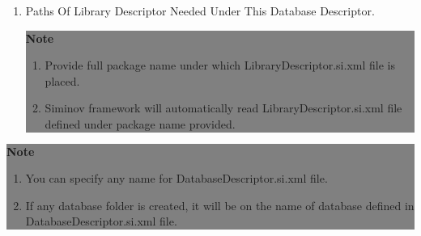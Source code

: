 \begin{enumerate}
\begin{center}
			\end{center}

	\item \small Paths Of Library Descriptor Needed Under This Database Descriptor.

			\begin{center}
				\colorbox{grey}{
					\parbox[t]{.8\linewidth}{
						\fontsize{11pt}{11pt}\selectfont %
						\vspace*{0.1cm} %
		
						\hfill \textbf{Note} \\

						\hfill 

						\begin{enumerate}

							\item \small Provide full package name under which LibraryDescriptor.si.xml file is placed.

							\item \small Siminov framework will automatically read LibraryDescriptor.si.xml file defined under package name provided.
	
						\end{enumerate}

						\vspace*{0.0cm} %
					}
			}

			\end{center}

\end{enumerate}


	\begin{center}
		\colorbox{grey}{
			\parbox[t]{.8\linewidth}{
				\fontsize{11pt}{11pt}\selectfont %
				\vspace*{0.1cm} %
		
				\hfill \textbf{Note} \\

				\hfill 

				\begin{enumerate}

					\item \small You can specify any name for DatabaseDescriptor.si.xml file.

					\item \small If any database folder is created, it will be on the name of database defined in DatabaseDescriptor.si.xml file.
	
				\end{enumerate}

				\vspace*{0.0cm} %
			}
	}

\end{center}

